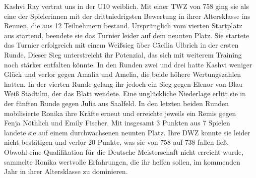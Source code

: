 \documentclass[a4paper,ngerman]{tui-algo-seminar}
\begin{document}
Kashvi Ray vertrat uns in der U10 weiblich. Mit einer TWZ von 758 ging sie als eine der Spielerinnen mit der drittniedrigsten Bewertung in ihrer Altersklasse ins Rennen, die aus 12 Teilnehmern bestand. Ursprünglich vom vierten Startplatz aus startend, beendete sie das Turnier leider auf dem neunten Platz. Sie startete das Turnier erfolgreich mit einem Weißsieg über Cäcilia Ulbrich in der ersten Runde. Dieser Sieg unterstreicht ihr Potenzial, das sich mit weiterem Training noch stärker entfalten könnte. In den Runden zwei und drei hatte Kashvi weniger Glück und verlor gegen Amalia und Amelia, die beide höhere Wertungszahlen hatten. In der vierten Runde gelang ihr jedoch ein Sieg gegen Elenor von Blau Weiß Stadtilm, der das Blatt wendete. Eine unglückliche Niederlage erlitt sie in der fünften Runde gegen Julia aus Saalfeld. In den letzten beiden Runden mobilisierte Ronika ihre Kräfte erneut und erreichte jeweils ein Remis gegen Fenja Nöthlich und Emily Fischer. Mit insgesamt 3 Punkten aus 7 Spielen landete sie auf einem durchwachsenen neunten Platz. Ihre DWZ konnte sie leider nicht bestätigen und verlor 20 Punkte, was sie von 758 auf 738 fallen ließ. Obwohl eine Qualifikation für die Deutsche Meisterschaft nicht erreicht wurde, sammelte Ronika wertvolle Erfahrungen, die ihr helfen sollen, im kommenden Jahr in ihrer Altersklasse zu dominieren. \\
\end{document}
